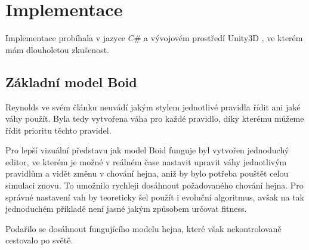 \section{Implementace}
Implementace probíhala v jazyce $C\#$ a vývojovém prostředí Unity3D \cite{Unity}, ve kterém mám dlouholetou zkušenost. 
\subsection{Základní model Boid}
Reynolds ve svém článku neuvádí jakým stylem jednotlivé pravidla řídit ani jaké váhy použít. Byla tedy vytvořena váha pro každé pravidlo, díky kterému můžeme řídit prioritu těchto pravidel. 
\par
Pro lepší vizuální představu jak model Boid funguje byl vytvořen jednoduchý editor, ve kterém je možné v reálném čase nastavit upravit váhy jednotlivým pravidlům a vidět změnu v chování hejna, aniž by bylo potřeba pouštět celou simulaci znovu. To umožnilo rychleji dosáhnout požadovaného chování hejna. Pro správné nastavení vah by teoreticky šel použít i evoluční algoritmus, avšak na tak jednoduchém příkladě není jasné jakým způsobem určovat fitness. 
\par
Podařilo se dosáhnout fungujícího modelu hejna, které však nekontrolovaně cestovalo po světě. 
